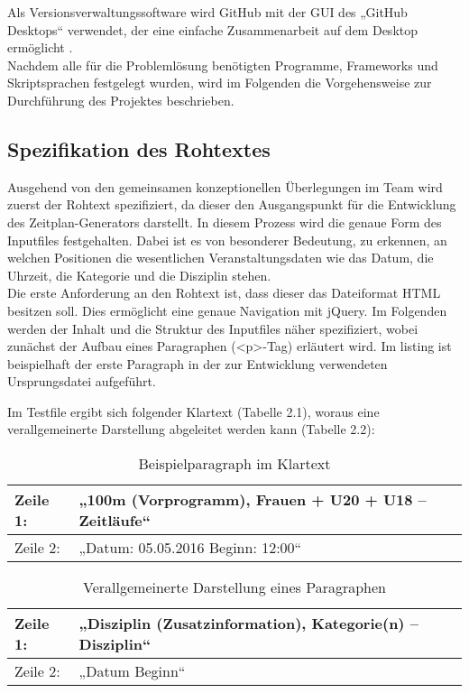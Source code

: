 Als Versionsverwaltungssoftware wird GitHub mit der \ac{GUI} des „GitHub Desktops“ verwendet, der eine einfache Zusammenarbeit auf dem Desktop ermöglicht \cite{github}.  \\
Nachdem alle für die Problemlösung benötigten Programme, Frameworks und Skriptsprachen festgelegt wurden, wird im Folgenden die Vorgehensweise zur Durchführung des Projektes beschrieben.

\subsection{Spezifikation des Rohtextes}

Ausgehend von den gemeinsamen konzeptionellen Überlegungen im Team wird zuerst der Rohtext spezifiziert, da dieser den Ausgangspunkt für die Entwicklung des Zeitplan-Generators darstellt. In diesem Prozess wird die genaue Form des Inputfiles festgehalten. Dabei ist es von besonderer Bedeutung, zu erkennen, an welchen Positionen die wesentlichen Veranstaltungsdaten wie das Datum, die Uhrzeit, die Kategorie und die Disziplin stehen.\\
Die erste Anforderung an den Rohtext ist, dass dieser das Dateiformat HTML besitzen soll. Dies ermöglicht eine genaue Navigation mit jQuery. Im Folgenden werden der Inhalt und die Struktur des Inputfiles näher spezifiziert, wobei zunächst der Aufbau eines Paragraphen (<p>-Tag) erläutert wird. Im listing ist beispielhaft der erste Paragraph in der zur Entwicklung verwendeten Ursprungsdatei aufgeführt. 
\lstset{language=html}

Im Testfile ergibt sich folgender Klartext (Tabelle 2.1), woraus eine verallgemeinerte Darstellung abgeleitet werden kann (Tabelle 2.2):\\
\begin{table}[h]
\caption{Beispielparagraph im Klartext}
\begin{tabular}{|l||l|}
\hline
Zeile 1: & „100m (Vorprogramm), Frauen + U20 + U18 – Zeitläufe“ \\
\hline
Zeile 2: & „Datum: 05.05.2016 Beginn: 12:00“ \\
\hline
\end{tabular}
\label{tab:Beispielparagraph im Klartext}
\end{table}
\begin{table}[h]
\caption{Verallgemeinerte Darstellung eines Paragraphen}
\begin{tabular}{|l||l|}
\hline
Zeile 1: & „Disziplin (Zusatzinformation), Kategorie(n) – Disziplin“ \\
\hline
Zeile 2: & „Datum Beginn“ \\
\hline
\end{tabular} 
\label{tab:Verallgemeinerte Darstellung eines Paragraphen}
\end{table}\\
